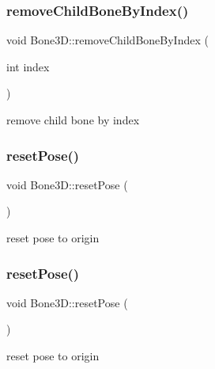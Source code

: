 \subsubsection{\texorpdfstring{remove\+Child\+Bone\+By\+Index()}{removeChildBoneByIndex()}\hspace{0.1cm}{\footnotesize\ttfamily [2/2]}}
{\footnotesize\ttfamily void Bone3\+D\+::remove\+Child\+Bone\+By\+Index (\begin{DoxyParamCaption}\item[{int}]{index }\end{DoxyParamCaption})}

remove child bone by index \mbox{\label{classBone3D_af6fe8d8595d2ffa91b490de86ce6e3e2}} 
\subsubsection{\texorpdfstring{reset\+Pose()}{resetPose()}\hspace{0.1cm}{\footnotesize\ttfamily [1/2]}}
{\footnotesize\ttfamily void Bone3\+D\+::reset\+Pose (\begin{DoxyParamCaption}{ }\end{DoxyParamCaption})}

reset pose to origin \mbox{\label{classBone3D_af6fe8d8595d2ffa91b490de86ce6e3e2}} 
\subsubsection{\texorpdfstring{reset\+Pose()}{resetPose()}\hspace{0.1cm}{\footnotesize\ttfamily [2/2]}}
{\footnotesize\ttfamily void Bone3\+D\+::reset\+Pose (\begin{DoxyParamCaption}{ }\end{DoxyParamCaption})}

reset pose to origin \mbox{\label{classBone3D_a70a3d6a845913aac7ac332e4e0eb5a3c}} 
